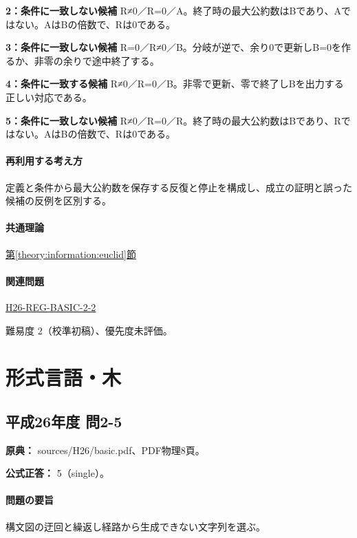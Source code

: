 \noindent\textbf{2：条件に一致しない候補} R≠0／R=\allowbreak{}0／A。終了時の最大公約数はBであり、Aではない。AはBの倍数で、Rは0である。\par

\noindent\textbf{3：条件に一致しない候補} R=\allowbreak{}0／R≠0／B。分岐が逆で、余り0で更新しB=\allowbreak{}0を作るか、非零の余りで途中終了する。\par

\noindent\textbf{4：条件に一致する候補} R≠0／R=\allowbreak{}0／B。非零で更新、零で終了しBを出力する正しい対応である。\par

\noindent\textbf{5：条件に一致しない候補} R≠0／R=\allowbreak{}0／R。終了時の最大公約数はBであり、Rではない。AはBの倍数で、Rは0である。\par

\paragraph{再利用する考え方} 定義と条件から最大公約数を保存する反復と停止を構成し、成立の証明と誤った候補の反例を区別する。

\paragraph{共通理論} \hyperref[theory:information:euclid]{第\ref*{theory:information:euclid}節}

\paragraph{関連問題} \hyperref[q:h26-reg-basic-2-2]{H26-REG-BASIC-2-2}

\par 難易度 2（校準初稿）、優先度未評価。

\section{形式言語・木}

\subsection{平成26年度 問2-5}
\label{q:h26-reg-basic-2-5}

\noindent\textbf{原典：} sources/H26/basic.pdf、PDF物理8頁。

\textbf{公式正答：} 5（single）。

\paragraph{問題の要旨} 構文図の迂回と繰返し経路から生成できない文字列を選ぶ。

